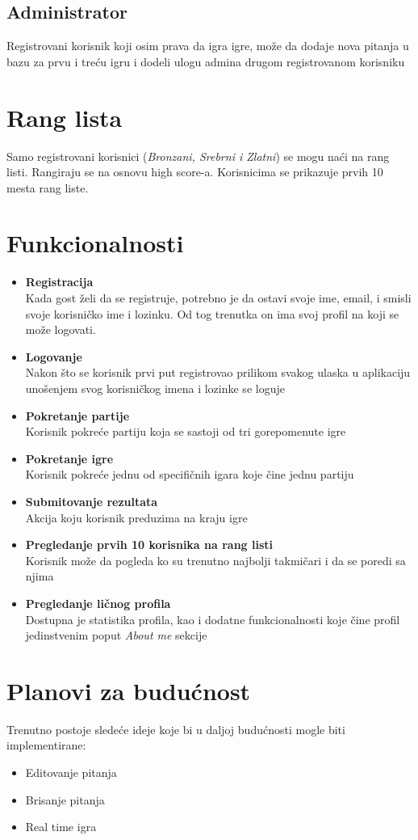 \documentclass{article}
\begin{document}
\subsection{Administrator}
Registrovani korisnik koji osim prava da igra igre, može da dodaje nova pitanja u bazu za 
prvu i treću igru i dodeli ulogu admina drugom registrovanom korisniku
\newpage
\section{Rang lista}
Samo registrovani korisnici (\textit{Bronzani, Srebrni i Zlatni}) se mogu naći na rang listi. Rangiraju se na osnovu 
high score-a. Korisnicima se prikazuje prvih 10 mesta rang liste.
\section{Funkcionalnosti}
\begin{itemize}
    \item \textbf{Registracija} \\
    Kada gost želi da se registruje, potrebno je da ostavi svoje ime, email, i smisli svoje 
korisničko ime i lozinku. Od tog trenutka on ima svoj profil na koji se može logovati.
    \item \textbf{Logovanje} \\
    Nakon što se korisnik prvi put registrovao prilikom svakog ulaska u aplikaciju unošenjem 
svog korisničkog imena i lozinke se loguje
    \item \textbf{Pokretanje partije} \\
    Korisnik pokreće partiju koja se sastoji od tri gorepomenute igre

    \item \textbf{Pokretanje igre} \\
    Korisnik pokreće jednu od specifičnih igara koje čine jednu partiju

    \item \textbf{Submitovanje rezultata} \\
    Akcija koju korisnik preduzima na kraju igre
    \item \textbf{Pregledanje prvih 10 korisnika na rang listi} \\
    Korisnik može da pogleda ko su trenutno najbolji takmičari i da se poredi sa njima
    \item \textbf{Pregledanje ličnog profila} \\
    Dostupna je statistika profila, kao i dodatne funkcionalnosti koje čine profil jedinstvenim 
poput \textit{About me} sekcije
\end{itemize}
\section{Planovi za budućnost}
Trenutno postoje sledeće ideje koje bi u daljoj budućnosti mogle biti implementirane:
\begin{itemize}
    \item Editovanje pitanja
    \item Brisanje pitanja
    \item Real time igra
\end{itemize}
\end{document}
